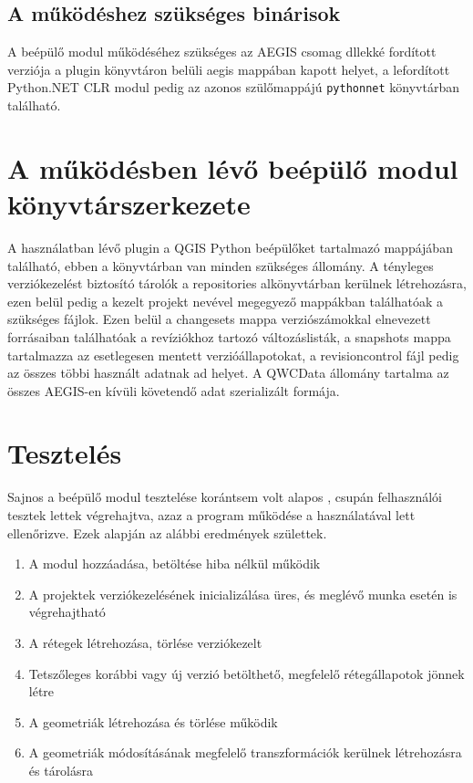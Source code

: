 \subsection{A működéshez szükséges binárisok}
A beépülő modul működéséhez szükséges az AEGIS csomag dllekké fordított verziója a plugin könyvtáron belüli aegis mappában kapott helyet, a lefordított Python.NET CLR modul pedig az azonos szülőmappájú \texttt{pythonnet} könyvtárban található.

\section{A működésben lévő beépülő modul könyvtárszerkezete}
A használatban lévő plugin a QGIS Python beépülőket tartalmazó mappájában található, ebben a könyvtárban van minden szükséges állomány. A tényleges verziókezelést biztosító tárolók a repositories alkönyvtárban kerülnek létrehozásra, ezen belül pedig a kezelt projekt nevével megegyező mappákban találhatóak a szükséges fájlok. Ezen belül a changesets mappa verziószámokkal elnevezett forrásaiban találhatóak a revíziókhoz tartozó változáslisták, a snapshots mappa tartalmazza az esetlegesen mentett verzióállapotokat, a revisioncontrol fájl pedig az összes többi használt adatnak ad helyet. A QWCData állomány tartalma az összes AEGIS-en kívüli követendő adat szerializált formája.

\section{Tesztelés}
Sajnos a beépülő modul tesztelése korántsem volt alapos , csupán felhasználói tesztek lettek végrehajtva, azaz a program működése a használatával lett ellenőrizve. Ezek alapján az alábbi eredmények születtek.
\begin{enumerate}
	\item A modul hozzáadása, betöltése hiba nélkül működik
	\item A projektek verziókezelésének inicializálása üres, és meglévő munka esetén is végrehajtható
	\item A rétegek létrehozása, törlése verziókezelt
	\item Tetszőleges korábbi vagy új verzió betölthető, megfelelő rétegállapotok jönnek létre
	\item A geometriák létrehozása és törlése működik
	\item A geometriák módosításának megfelelő transzformációk kerülnek létrehozásra és tárolásra
\end{enumerate}

